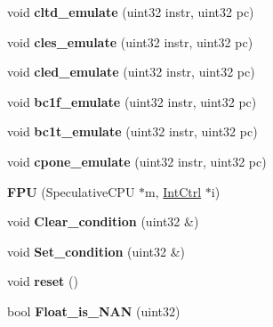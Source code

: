 \begin{DoxyCompactItemize}
\item 
\hypertarget{classFPU_a49b0cc0e170f59dbfcbbc46eb96fa7cd}{
void {\bfseries cltd\_\-emulate} (uint32 instr, uint32 pc)}
\label{classFPU_a49b0cc0e170f59dbfcbbc46eb96fa7cd}

\item 
\hypertarget{classFPU_af7d7d86382989aefef81d8f4a6f8bcd4}{
void {\bfseries cles\_\-emulate} (uint32 instr, uint32 pc)}
\label{classFPU_af7d7d86382989aefef81d8f4a6f8bcd4}

\item 
\hypertarget{classFPU_a6764d43d5047b524de49904bf2e03d38}{
void {\bfseries cled\_\-emulate} (uint32 instr, uint32 pc)}
\label{classFPU_a6764d43d5047b524de49904bf2e03d38}

\item 
\hypertarget{classFPU_ad88746f20edf49cd5b23c1ed0fa2b2b9}{
void {\bfseries bc1f\_\-emulate} (uint32 instr, uint32 pc)}
\label{classFPU_ad88746f20edf49cd5b23c1ed0fa2b2b9}

\item 
\hypertarget{classFPU_a1f206e5e99c26c62d47e66d298b8f7b8}{
void {\bfseries bc1t\_\-emulate} (uint32 instr, uint32 pc)}
\label{classFPU_a1f206e5e99c26c62d47e66d298b8f7b8}

\item 
\hypertarget{classFPU_a7772a53202d001dc8ea724778b10684f}{
void {\bfseries cpone\_\-emulate} (uint32 instr, uint32 pc)}
\label{classFPU_a7772a53202d001dc8ea724778b10684f}

\item 
\hypertarget{classFPU_a1cbfbf811bb78caad1d27fb10f701782}{
{\bfseries FPU} (SpeculativeCPU $\ast$m, \hyperlink{classIntCtrl}{IntCtrl} $\ast$i)}
\label{classFPU_a1cbfbf811bb78caad1d27fb10f701782}

\item 
\hypertarget{classFPU_a88f9eec5026c8cbb0221fbd0491d3140}{
void {\bfseries Clear\_\-condition} (uint32 \&)}
\label{classFPU_a88f9eec5026c8cbb0221fbd0491d3140}

\item 
\hypertarget{classFPU_a5520a13dac0d050832a245f43f6d5a38}{
void {\bfseries Set\_\-condition} (uint32 \&)}
\label{classFPU_a5520a13dac0d050832a245f43f6d5a38}

\item 
\hypertarget{classFPU_a279cdfd9bfd4d95200ad050a796d8c65}{
void {\bfseries reset} ()}
\label{classFPU_a279cdfd9bfd4d95200ad050a796d8c65}

\item 
\hypertarget{classFPU_aecbf73903f26ca2ebbfaacefa154bb71}{
bool {\bfseries Float\_\-is\_\-NAN} (uint32)}
\label{classFPU_aecbf73903f26ca2ebbfaacefa154bb71}


\end{DoxyCompactItemize}
